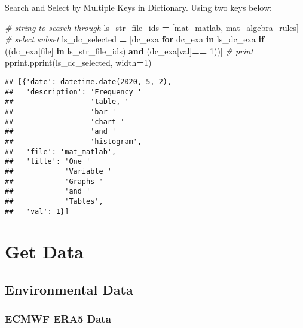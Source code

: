\documentclass[
]{book}
\newenvironment{Shaded}{\begin{snugshade}}{\end{snugshade}}
\newcommand{\CommentTok}[1]{\textcolor[rgb]{0.56,0.35,0.01}{\textit{#1}}}
\newcommand{\ControlFlowTok}[1]{\textcolor[rgb]{0.13,0.29,0.53}{\textbf{#1}}}
\newcommand{\DecValTok}[1]{\textcolor[rgb]{0.00,0.00,0.81}{#1}}
\newcommand{\KeywordTok}[1]{\textcolor[rgb]{0.13,0.29,0.53}{\textbf{#1}}}
\newcommand{\NormalTok}[1]{#1}
\newcommand{\OperatorTok}[1]{\textcolor[rgb]{0.81,0.36,0.00}{\textbf{#1}}}
\newcommand{\StringTok}[1]{\textcolor[rgb]{0.31,0.60,0.02}{#1}}
\begin{document}
Search and Select by Multiple Keys in Dictionary. Using two keys below:

\begin{Shaded}
\begin{Highlighting}[]
\CommentTok{\# string to search through}
\NormalTok{ls\_str\_file\_ids }\OperatorTok{=}\NormalTok{ [}\StringTok{\textquotesingle{}mat\_matlab\textquotesingle{}}\NormalTok{, }\StringTok{\textquotesingle{}mat\_algebra\_rules\textquotesingle{}}\NormalTok{]}
\CommentTok{\# select subset}
\NormalTok{ls\_dc\_selected }\OperatorTok{=}\NormalTok{ [dc\_exa}
                  \ControlFlowTok{for}\NormalTok{ dc\_exa }\KeywordTok{in}\NormalTok{ ls\_dc\_exa}
                  \ControlFlowTok{if}\NormalTok{ ((dc\_exa[}\StringTok{\textquotesingle{}file\textquotesingle{}}\NormalTok{] }\KeywordTok{in}\NormalTok{ ls\_str\_file\_ids) }
                      \KeywordTok{and}
\NormalTok{                      (dc\_exa[}\StringTok{\textquotesingle{}val\textquotesingle{}}\NormalTok{]}\OperatorTok{==} \DecValTok{1}\NormalTok{))]}
\CommentTok{\# print}
\NormalTok{pprint.pprint(ls\_dc\_selected, width}\OperatorTok{=}\DecValTok{1}\NormalTok{)}
\end{Highlighting}
\end{Shaded}

\begin{verbatim}
## [{'date': datetime.date(2020, 5, 2),
##   'description': 'Frequency '
##                  'table, '
##                  'bar '
##                  'chart '
##                  'and '
##                  'histogram',
##   'file': 'mat_matlab',
##   'title': 'One '
##            'Variable '
##            'Graphs '
##            'and '
##            'Tables',
##   'val': 1}]
\end{verbatim}

\hypertarget{get-data}{%
\chapter{Get Data}\label{get-data}}

\hypertarget{environmental-data}{%
\section{Environmental Data}\label{environmental-data}}

\hypertarget{ecmwf-era5-data}{%
\subsection{ECMWF ERA5 Data}\label{ecmwf-era5-data}}
\end{document}
